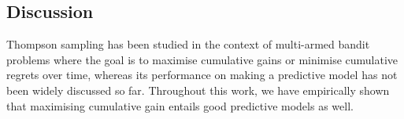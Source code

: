 \documentclass[a0,landscape]{a0poster}
\newcommand{\secmoveup}{\vspace{-1cm}}
\begin{document}
\begin{multicols}{3}
\secmoveup
\section{Discussion}
Thompson sampling has been studied in the context of multi-armed bandit problems where the goal is to maximise cumulative gains or minimise cumulative regrets over time, whereas its performance on making a predictive model has not been widely discussed so far. Throughout this work, we have empirically shown that maximising cumulative gain entails good predictive models as well.





\end{multicols}
\end{document}
